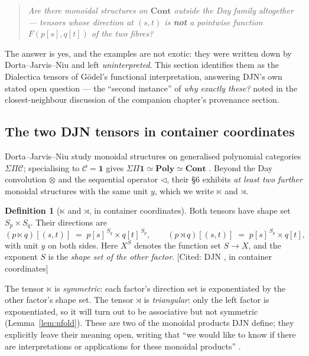 \documentclass[11pt,a4paper]{article}
\newcommand{\Cont}{\mathbf{Cont}}
\newcommand{\Poly}{\mathbf{Poly}}
\newcommand{\tri}{\mathbin{\triangleleft}}
\newcommand{\dir}{\mathbin{\otimes}}
\theoremstyle{plain}
\theoremstyle{definition}
\newtheorem{Definition}[Theorem]{Definition}
\theoremstyle{remark}
\newcommand{\prov}[1]{\hfill\textsf{\footnotesize[#1]}}
\begin{document}
\begin{quote}
\emph{Are there monoidal structures on $\Cont$ outside the Day family
altogether --- tensors whose direction at $(s,t)$ is \textbf{not} a pointwise
function $F(p[s],q[t])$ of the two fibres?}
\end{quote}

The answer is yes, and the examples are not exotic: they were written down by
Dorta--Jarvis--Niu \cite{DJN23} and left \emph{uninterpreted}. This section
identifies them as the Dialectica tensors of Gödel's functional interpretation,
answering DJN's own stated open question --- the ``second instance'' of
\emph{why exactly these?} noted in the closest-neighbour discussion of the
companion chapter's provenance section.

\subsection{The two DJN tensors in container coordinates}
\label{sec:dia-def}

Dorta--Jarvis--Niu study monoidal structures on generalised polynomial
categories $\Sigma\Pi\mathcal C$; specialising to $\mathcal C=\mathbf 1$ gives
$\Sigma\Pi\mathbf 1\simeq\Poly\simeq\Cont$ \cite[Prop.~2.9]{DJN23}. Beyond the
Day convolution $\dir$ and the sequential operator $\tri$, their \S6 exhibits
\emph{at least two further} monoidal structures with the same unit $y$, which we
write $\ltimes$ and $\rtimes$.

\begin{Definition}[$\ltimes$ and $\rtimes$, in container coordinates]
\label{def:dia-tensors}
Both tensors have shape set $S_p\times S_q$. Their directions are
\[
  (p\ltimes q)[(s,t)] \;=\; p[s]^{\,S_q}\times q[t]^{\,S_p},
  \qquad
  (p\rtimes q)[(s,t)] \;=\; p[s]^{\,S_q}\times q[t],
\]
with unit $y$ on both sides. Here $X^{S}$ denotes the function set $S\to X$, and
the exponent $S$ is the \emph{shape set of the other factor}.
\prov{Cited: DJN \cite[\S6]{DJN23}, in container coordinates}
\end{Definition}

The tensor $\ltimes$ is \emph{symmetric}: each factor's direction set is
exponentiated by the other factor's shape set. The tensor $\rtimes$ is
\emph{triangular}: only the left factor is exponentiated, so it will turn out to
be associative but not symmetric (Lemma~\ref{lem:nfold}). These are two of the
monoidal products DJN define; they explicitly leave their meaning open, writing
that ``we would like to know if there are interpretations or applications for
these monoidal products'' \cite{DJN23}.
\end{document}
